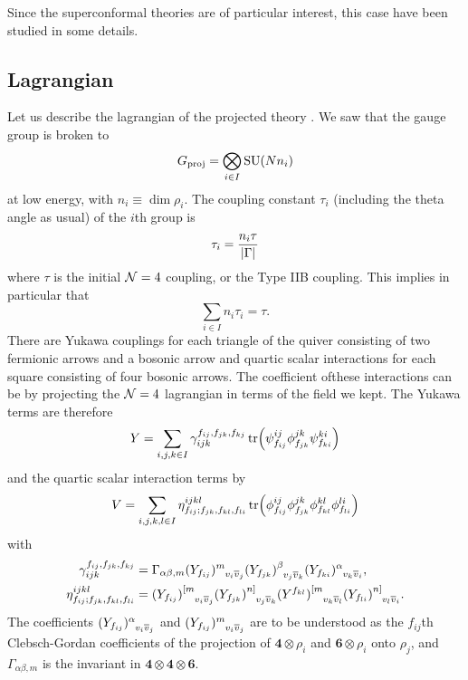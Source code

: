     Since the superconformal theories are of particular interest, this case have been studied in some details.

    \subsection{Lagrangian}

        Let us describe the lagrangian of the projected theory \cite{vafa1998}. We saw that the gauge group is broken to 
        \begin{equation}
            G_{\text{proj}}=\bigotimes_{i\in I}\text{SU}(N n_i)
        \end{equation}
        at low energy, with $n_i\equiv\dim\rho_i$. The coupling constant $\tau_i$ (including the theta angle as usual) of the $i$th group is
        \begin{equation}
            \tau_i=\frac{n_i\tau}{\abs{\Gamma}}
        \end{equation}
        where $\tau$ is the initial $\mathcal{N}=4$ coupling, or the Type IIB coupling. This implies in particular that
        \begin{equation}
            \sum_{i\in I}n_i\tau_i=\tau.
        \end{equation}
        There are Yukawa couplings for each triangle of the quiver consisting of two fermionic arrows and a bosonic arrow and quartic scalar interactions for each square consisting of four bosonic arrows. The coefficient ofthese interactions can be by projecting the $\mathcal{N}=4$ lagrangian in terms of the field we kept. The Yukawa terms are therefore
        \begin{equation}
            Y=\sum_{i,j,k\in I}\gamma^{f_{ij},f_{jk},f_{kj}}_{ijk}\tr(\psi^{ij}_{f_{ij}}\phi^{jk}_{f_{jk}}\psi^{ki}_{f_{ki}})
        \end{equation}
        and the quartic scalar interaction terms by
        \begin{equation}
            V=\sum_{i,j,k,l\in I}\eta^{ijkl}_{f_{ij};f_{jk},f_{kl},f_{li}}\tr(\phi^{ij}_{f_{ij}}\phi^{jk}_{f_{jk}}\phi^{kl}_{f_{kl}}\phi^{li}_{f_{li}})
        \end{equation}
        with
        \begin{align}
            \gamma^{f_{ij},f_{jk},f_{kj}}_{ijk} &= \Gamma_{\alpha\beta,m}(Y_{f_{ij}})\indices{^m_{v_i\bar{v}_j}}(Y_{f_{jk}})\indices{^\beta_{v_j\bar{v}_k}}(Y_{f_{ki}})\indices{^\alpha_{v_k\bar{v}_i}}, \\
            \eta^{ijkl}_{f_{ij};f_{jk},f_{kl},f_{li}} &= (Y_{f_{ij}})\indices{^{[m}_{v_i\bar{v}_j}}(Y_{f_{jk}})\indices{^{n]}_{v_j\bar{v}_k}}(Y^{f_{kl}})\indices{^{[m}_{v_k\bar{v}_l}}(Y_{f_{li}})\indices{^{n]}_{v_l\bar{v}_i}}.
        \end{align}
        The coefficients $(Y_{f_{ij}})\indices{^\alpha_{v_i\bar{v}_j}}$ and $(Y_{f_{ij}})\indices{^m_{v_i\bar{v}_j}}$ are to be understood as the $f_{ij}$th Clebsch-Gordan coefficients of the projection of $\boldsymbol{4}\otimes\rho_i$ and $\boldsymbol{6}\otimes\rho_i$ onto $\rho_j$, and $\Gamma_{\alpha\beta,m}$ is the invariant in $\boldsymbol{4}\otimes\boldsymbol{4}\otimes\boldsymbol{6}$.

